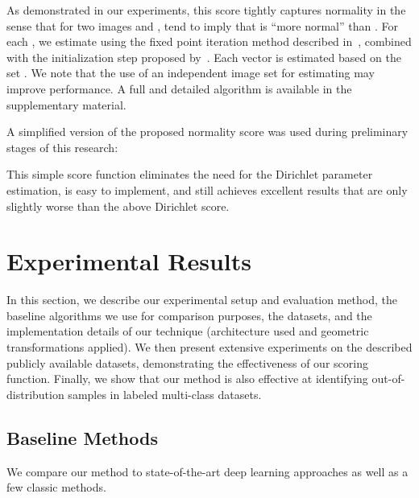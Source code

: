 \documentclass{article}
\begin{document}
    


As demonstrated in our experiments, this score tightly captures normality in the sense that for two images  and ,  tend to imply that  is ``more normal'' than .
    For each , we estimate  using the fixed point iteration method described in~\cite{minka2000estimating}, combined with the initialization step proposed by~\citet{wicker2008maximum}. 
    Each vector  is estimated based on the set . We note that the use of an independent image set for estimating   may improve performance. A full and detailed algorithm is available in the supplementary material.
    
    A simplified version of the proposed normality score was used during preliminary stages of this research:
    
	This simple score function eliminates the need for the Dirichlet parameter estimation, is easy to implement, and still achieves excellent results that are only slightly worse than the above Dirichlet score.


	
	\section{Experimental Results}
	In this section, we describe our experimental setup and evaluation method,
	the baseline algorithms we use for comparison purposes, the datasets, and
	the implementation details of our technique (architecture used and geometric transformations applied).
	We then present extensive experiments on the described publicly available datasets, demonstrating the effectiveness of our scoring function. 
	Finally, we show that our method is also effective at identifying out-of-distribution samples in labeled multi-class datasets.
	
	\subsection{Baseline Methods}
	We compare our method to state-of-the-art deep learning approaches 
	as well as a few classic methods.
	
\end{document}

